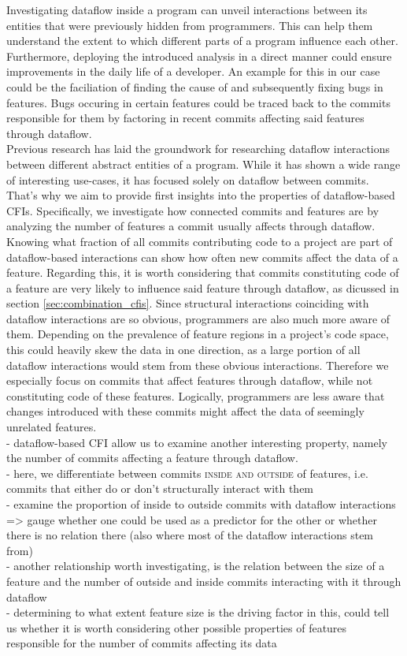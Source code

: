 Investigating dataflow inside a program can unveil interactions between its entities that were previously hidden from programmers.
This can help them understand the extent to which different parts of a program influence each other.
Furthermore, deploying the introduced analysis in a direct manner could ensure improvements in the daily life of a developer.
An example for this in our case could be the faciliation of finding the cause of and subsequently fixing bugs in features.
Bugs occuring in certain features could be traced back to the commits responsible for them by factoring in recent commits affecting said features through dataflow. \\
Previous research has laid the groundwork for researching dataflow interactions between different abstract entities of a program.
While it has shown a wide range of interesting use-cases, it has focused solely on dataflow between commits.
That's why we aim to provide first insights into the properties of dataflow-based CFIs.
Specifically, we investigate how connected commits and features are by analyzing the number of features a commit usually affects through dataflow.
Knowing what fraction of all commits contributing code to a project are part of dataflow-based interactions can show how often new commits affect the data of a feature. 
Regarding this, it is worth considering that commits constituting code of a feature are very likely to influence said feature through dataflow, as dicussed in section \ref{sec:combination_cfis}.
Since structural interactions coinciding with dataflow interactions are so obvious, programmers are also much more aware of them. 
Depending on the prevalence of feature regions in a project's code space, this could heavily skew the data in one direction, as a large portion of all dataflow interactions would stem from these obvious interactions. 
Therefore we especially focus on commits that affect features through dataflow, while not constituting code of these features.
Logically, programmers are less aware that changes introduced with these commits might affect the data of seemingly unrelated features. \\
- dataflow-based CFI allow us to examine another interesting property, namely the number of commits affecting a feature through dataflow. \\
- here, we differentiate between commits \textsc{inside and outside} of features, i.e. commits that either do or don't structurally interact with them \\
- examine the proportion of inside to outside commits with dataflow interactions => gauge whether one could be used as a predictor for the other or whether there is no relation there (also where most of the dataflow interactions stem from) \\
- another relationship worth investigating, is the relation between the size of a feature and the number of outside and inside commits interacting with it through dataflow \\
- determining to what extent feature size is the driving factor in this, could tell us whether it is worth considering other possible properties of features responsible for the number of commits affecting its data 

